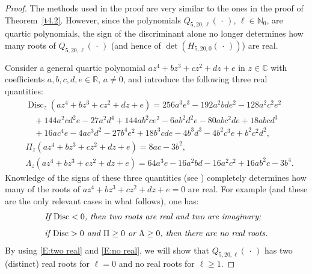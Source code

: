 \documentclass[reqno,11pt,centertags]{amsart}
\newcommand{\bbN}{{\mathbb{N}}}
\newcommand{\bbR}{{\mathbb{R}}}
\newcommand{\bbC}{{\mathbb{C}}}
\newcommand{\<}{\langle}
\renewcommand{\>}{\rangle}
\newcommand{\no}{\nonumber}
\newcommand{\lb}{\label}
\newcommand{\dott}{\,\cdot\,}
\numberwithin{equation}{section}
\theoremstyle{definition}
\begin{document}
\begin{proof} The methods used in the proof are very similar to the ones in the proof of Theorem~\ref{t4.2}. However, since the polynomials $Q_{5,20,\ell}(\dott)$, $\ell \in \bbN_0$,
are  quartic polynomials, the sign of the discriminant alone no longer determines how many roots of  $Q_{5,20,\ell}(\dott)$ (and hence  of $\det (H_{5,20,0}(\dott))$) are real.

Consider a general quartic polynomial $az^4+bz^3+cz^2+dz+e$ in $z\in \bbC$ with coefficients $a,b,c,d,e\in \bbR$, $a\not=0$, and introduce the following three real quantities:
\begin{align}
& \operatorname{Disc}_z(az^4+bz^3+cz^2+dz+e)=256 a^3 e^3-192 a^2 b d e^2-128 a^2 c^2 e^2 \\ 
&\quad +144 a^2 c d^2 e-27 a^2 d^4+144 a b^2 c e^2-6 a b^2 d^2 e-80 a b c^2 d e+18 a b c d^3\no \\
&\quad +16 a c^4 e-4 a c^3 d^2-27 b^4 e^2+18 b^3 c d e-4 b^3 d^3-4 b^2 c^3 e+b^2 c^2 d^2,\no \\[5pt]
& \Pi_z(az^4+bz^3+cz^2+dz+e)=8ac-3b^2, \lb{E:Pi}\\[5pt] 
& \Lambda_z(az^4+bz^3+cz^2+dz+e)=64 a^3 e-16 a^2 b d-16 a^2 c^2+16 a b^2 c-3 b^4. \lb{E:Lambda}
\end{align}
Knowledge of the signs of these three quantities (see \cite[p. 45]{Di14}) completely determines how many of the roots of $az^4+bz^3+cz^2+dz+e=0$
are real.
For example (and these are the only relevant cases in what follows),
one has:
\begin{align}
&  \text{\it If $ \operatorname{Disc}<0$, then two roots are real and two are imaginary;}\lb{E:two real}\\[5pt]
& \text{\it  if $ \operatorname{Disc}>0$ and $\Pi\geq 0$ or $\Lambda\geq 0$, then there are no real roots.}\lb{E:no real}
\end{align}
By using \eqref{E:two real} and \eqref{E:no real}, we will show that  $Q_{5,20,\ell}(\dott)$ has two (distinct) real roots for $\ell=0$ and no real roots for $\ell\geq 1$.


\end{proof}
\end{document}
